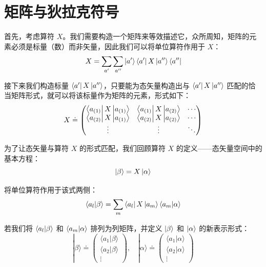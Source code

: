 \section{矩阵与狄拉克符号}
首先，考虑算符 $X$。我们需要构造一个矩阵来等效描述它，众所周知，矩阵的元素必须是标量（数）而非矢量，因此我们可以将单位算符作用于 $X$：
\begin{equation}
	X = \sum_{a'} \sum_{a''} \ket{a'} \bra{a'} X \ket{a''} \bra{a''}
\end{equation}

接下来我们构造标量 $\bra{a'} X \ket{a''}$，只要能为态矢量构造出与 $\bra{a'} X \ket{a''}$ 匹配的恰当矩阵形式，就可以将该标量作为矩阵的元素，形式如下：
\begin{equation}
	X \doteq \begin{pmatrix}
		\bra{a_{(1)}} X \ket{a_{(1)}} & \bra{a_{(1)}} X \ket{a_{(2)}} & \cdots \\
		\bra{a_{(2)}} X \ket{a_{(1)}} & \bra{a_{(2)}} X \ket{a_{(2)}} & \cdots \\
		\vdots & \vdots & \ddots
	\end{pmatrix}
\end{equation}

为了让态矢量与算符 $X$ 的形式匹配，我们回顾算符 $X$ 的定义——态矢量空间中的基本方程：
\begin{equation}
	\ket{\beta} = X \ket{\alpha}
\end{equation}

将单位算符作用于该式两侧：
\begin{equation}
	\bra{a_l} \ket{\beta} = \sum_m \bra{a_l} X \ket{a_m} \bra{a_m} \ket{\alpha}
\end{equation}

若我们将 $\bra{a_l} \ket{\beta}$ 和 $\bra{a_m} \ket{\alpha}$ 排列为列矩阵，并定义 $\ket{\beta}$ 和 $\ket{\alpha}$ 的新表示形式：
\begin{equation}
	|\beta\rangle \doteq \begin{pmatrix}
		\langle a_1 | \beta \rangle \\
		\langle a_2 | \beta \rangle \\
		\vdots
	\end{pmatrix}, \quad
	|\alpha\rangle \doteq \begin{pmatrix}
		\langle a_1 | \alpha \rangle \\
		\langle a_2 | \alpha \rangle \\
		\vdots
	\end{pmatrix}
\end{equation}

